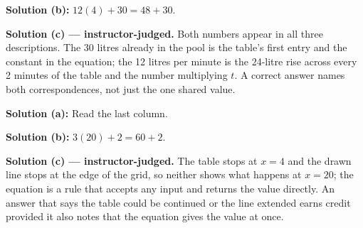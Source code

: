 \documentclass[12pt]{article}
\begin{document}
\textbf{Solution (b):} $12(4) + 30 = 48 + 30$. 

\textbf{Solution (c) --- instructor-judged.} Both numbers appear in all three
descriptions. The 30 litres already in the pool is the table's first entry and
the constant in the equation; the 12 litres per minute is the 24-litre rise
across every 2 minutes of the table and the number multiplying $t$. A correct
answer names both correspondences, not just the one shared value.


\textbf{Solution (a):} Read the last column. 

\textbf{Solution (b):} $3(20) + 2 = 60 + 2$. 

\textbf{Solution (c) --- instructor-judged.} The table stops at $x = 4$ and
the drawn line stops at the edge of the grid, so neither shows what happens at
$x = 20$; the equation is a rule that accepts any input and returns the value
directly. An answer that says the table could be continued or the line
extended earns credit provided it also notes that the equation gives the value
at once.
\end{document}

